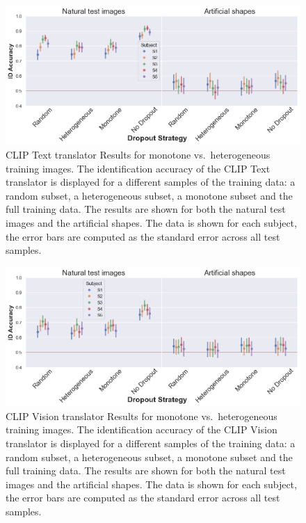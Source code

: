 \begin{figure}[H]
   \centering
   \includegraphics[width=1\textwidth]{plots/dropout_discussion_translator_id_acc_cliptext.png}
   \caption[CLIP Text translator Results for monotone vs.\ heterogeneous training images]{CLIP Text translator Results for monotone vs.\ heterogeneous training images. The identification accuracy of the CLIP Text translator is displayed for a different samples of the training data: a random subset, a heterogeneous subset, a monotone subset and the full training data. The results are shown for both the natural test images and the artificial shapes. The data is shown for each subject, the error bars are computed as the standard error across all test samples.}
   \label{fig:dropout_discussion_translator_id_acc_cliptext}
 \end{figure}
 
 \begin{figure}[H]
   \centering
   \includegraphics[width=1\textwidth]{plots/dropout_discussion_translator_id_acc_clipvision.png}
   \caption[CLIP Vision translator Results for monotone vs.\ heterogeneous training images]{CLIP Vision translator Results for monotone vs.\ heterogeneous training images. The identification accuracy of the CLIP Vision translator is displayed for a different samples of the training data: a random subset, a heterogeneous subset, a monotone subset and the full training data. The results are shown for both the natural test images and the artificial shapes. The data is shown for each subject, the error bars are computed as the standard error across all test samples.}\label{fig:dropout_discussion_translator_id_acc_clipvision}
 \end{figure}
 
